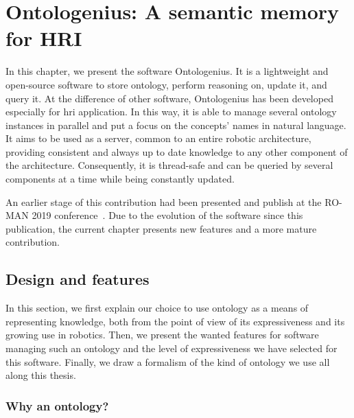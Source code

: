 \ifdefined{}
\else
\setcounter{chapter}{2} %
\dominitoc
\faketableofcontents
\fi

\chapter{Ontologenius: A semantic memory for HRI}
\label{chap:ontologenius}
\minitoc

In this chapter, we present the software Ontologenius. It is a lightweight and open-source software to store ontology, perform reasoning on, update it, and query it. At the difference of other software, Ontologenius has been developed especially for \acrlong{hri} application. In this way, it is able to manage several ontology instances in parallel and put a focus on the concepts' names in natural language. It aims to be used as a server, common to an entire robotic architecture, providing consistent and always up to date knowledge to any other component of the architecture. Consequently, it is thread-safe and can be queried by several components at a time while being constantly updated.

An earlier stage of this contribution had been presented and publish at the RO-MAN 2019 conference~\cite{sarthou_2019_ontologenius}. Due to the evolution of the software since this publication, the current chapter presents new features and a more mature contribution.

\section{Design and features}

In this section, we first explain our choice to use ontology as a means of representing knowledge, both from the point of view of its expressiveness and its growing use in robotics. Then, we present the wanted features for software managing such an ontology and the level of expressiveness we have selected for this software. Finally, we draw a formalism of the kind of ontology we use all along this thesis.

\subsection{Why an ontology?}

